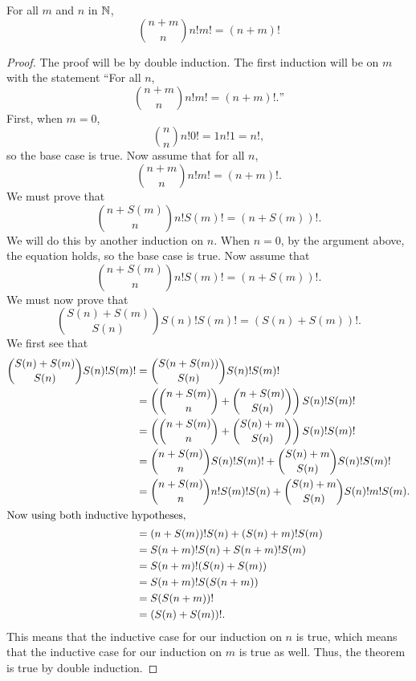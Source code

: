 \documentclass[../math.tex]{subfiles}
\begin{document}
\begin{theorem}
    For all $m$ and $n$ in $\mathbb{N}$,
    \[
        \binom{n + m}{n} n! m! = (n + m)!
    \]
\end{theorem}
\begin{proof}
    The proof will be by double induction.  The first induction will be on $m$
    with the statement ``For all $n$,
    \[
        \binom{n + m}{n} n! m! = (n + m)!.\text{''}
    \]
    First, when $m = 0$,
    \[
        \binom{n}{n} n! 0! = 1 n! 1 = n!,
    \]
    so the base case is true.  Now assume that for all $n$,
    \[
        \binom{n + m}{n} n! m! = (n + m)!.
    \]
    We must prove that
    \[
        \binom{n + S(m)}{n} n! S(m)! = (n + S(m))!.
    \]
    We will do this by another induction on $n$.  When $n = 0$, by the argument
    above, the equation holds, so the base case is true.  Now assume that
    \[
        \binom{n + S(m)}{n} n! S(m)! = (n + S(m))!.
    \]
    We must now prove that
    \[
        \binom{S(n) + S(m)}{S(n)} S(n)! S(m)! = (S(n) + S(m))!.
    \]
    We first see that
    \begin{align*}
        \binom{S(n) + S(m)}{S(n)} S(n)! S(m)! &=
            \binom{S(n + S(m))}{S(n)} S(n)! S(m)! \\
        &= \left( \binom{n + S(m)}{n} + \binom{n + S(m)}{S(n)} \right)
            S(n)! S(m)! \\
        &= \left( \binom{n + S(m)}{n} + \binom{S(n) + m}{S(n)} \right)
            S(n)! S(m)! \\
        &= \binom{n + S(m)}{n} S(n)! S(m)! +
            \binom{S(n) + m}{S(n)} S(n)! S(m)!  \\
        &= \binom{n + S(m)}{n} n! S(m)! S(n) +
            \binom{S(n) + m}{S(n)} S(n)! m! S(m). \\
    \intertext{Now using both inductive hypotheses,}
        &= (n + S(m))! S(n) + (S(n) + m)! S(m) \\
        &= S(n + m)! S(n) + S(n + m)! S(m) \\
        &= S(n + m)! (S(n) + S(m)) \\
        &= S(n + m)! S(S(n + m)) \\
        &= S(S(n + m))! \\
        &= (S(n) + S(m))!.
    \end{align*}
    This means that the inductive case for our induction on $n$ is true, which
    means that the inductive case for our induction on $m$ is true as well.
    Thus, the theorem is true by double induction.
\end{proof}
\end{document}
